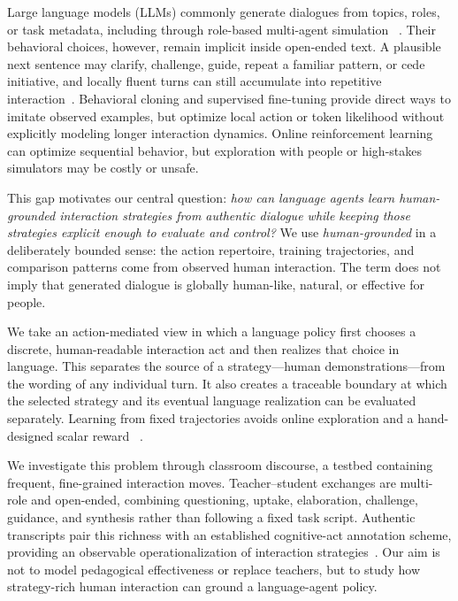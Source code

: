 \documentclass[manuscript,review,anonymous]{acmart}
\begin{document}
Large language models (LLMs) commonly generate dialogues from topics, roles,
or task metadata, including through role-based multi-agent simulation
~\citep{achiam2023gpt,kasneci2023chatgpt,park2023generative,zhang2024simulating,xi2025rise}.
Their behavioral choices, however, remain implicit inside open-ended text. A
plausible next sentence may clarify, challenge, guide, repeat a familiar
pattern, or cede initiative, and locally fluent turns can still accumulate
into repetitive interaction~\citep{li2016diversity,zhao2017learning}.
Behavioral cloning and supervised fine-tuning provide direct ways to imitate
observed examples, but optimize local action or token likelihood without
explicitly modeling longer interaction dynamics. Online reinforcement learning
can optimize sequential behavior, but exploration with people or high-stakes
simulators may be costly or unsafe.

This gap motivates our central question: \emph{how can language agents learn
human-grounded interaction strategies from authentic dialogue while keeping
those strategies explicit enough to evaluate and control?} We use
\emph{human-grounded} in a deliberately bounded sense: the action repertoire,
training trajectories, and comparison patterns come from observed human
interaction. The term does not imply that generated dialogue is globally
human-like, natural, or effective for people.

We take an action-mediated view in which a language policy first chooses a
discrete, human-readable interaction act and then realizes that choice in
language. This separates the source of a strategy---human demonstrations---from
the wording of any individual turn. It also creates a traceable boundary at
which the selected strategy and its eventual language realization can be
evaluated separately. Learning from fixed trajectories avoids online
exploration and a hand-designed scalar reward
~\citep{li2016deep,schulman2017proximal,ouyang2022training}.

We investigate this problem through classroom discourse, a testbed containing
frequent, fine-grained interaction moves. Teacher--student exchanges are
multi-role and open-ended, combining questioning, uptake, elaboration,
challenge, guidance, and synthesis rather than following a fixed task script.
Authentic transcripts pair this richness with an established cognitive-act
annotation scheme, providing an observable operationalization of interaction
strategies~\citep{songyu79}. Our aim is not to model pedagogical effectiveness
or replace teachers, but to study how strategy-rich human interaction can
ground a language-agent policy.
\end{document}
